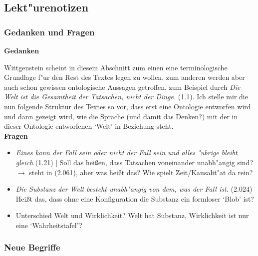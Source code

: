 \documentclass[]{scrartcl}
\begin{document}
\subsection{Lekt"urenotizen}
\subsubsection{Gedanken und Fragen}
\textbf{Gedanken}

Wittgenstein scheint in diesem Abschnitt zum einen eine terminologische Grundlage f"ur den Rest des Textes legen zu wollen, zum anderen werden aber auch schon gewissen ontologische Aussagen getroffen, zum Beispiel durch \emph{Die Welt ist die Gesamtheit der Tatsachen, nicht der Dinge.} (1.1). Ich stelle mir die nun folgende Struktur des Textes so vor, dass erst eine Ontologie entworfen wird und dann gezeigt wird, wie die Sprache (und damit das Denken?) mit der in dieser Ontologie entworfenen `Welt' in Beziehung steht. \newline
\\
\textbf{Fragen}

\begin{itemize}
  \item \emph{Eines kann der Fall sein oder nicht der Fall sein und alles "ubrige bleibt gleich} (1.21) | Soll das hei\ss en, dass Tatsachen voneinander unabh"angig sind? $\rightarrow$ steht in (2.061), aber was hei\ss t das? Wie spielt Zeit/Kausalit"at da rein?
  \item \emph{Die Substanz der Welt besteht unabh"angig von dem, was der Fall ist.} (2.024) Hei\ss t das, dass ohne eine Konfiguration die Substanz ein formloser `Blob' ist?
  \item Unterschied Welt und Wirklichkeit? Welt hat Substanz, Wirklichkeit ist nur eine `Wahrheitstafel'? 
\end{itemize}

\vspace{10pt}
\subsubsection{Neue Begriffe}
\end{document}
